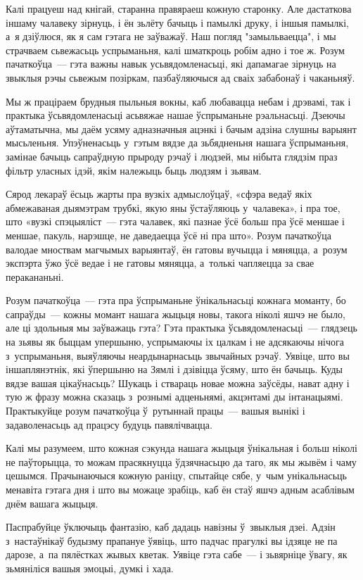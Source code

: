 Калі працуеш над кнігай, старанна правяраеш кожную старонку. Але дастаткова іншаму чалавеку зірнуць, і ён зьлёту бачыць і памылкі друку, і іншыя памылкі, а~я дзіўлюся, як я сам гэтага не заўважаў. Наш погляд "замыльваецца", і мы страчваем сьвежасьць успрыманьня, калі шматкроць робім адно і тое ж. Розум пачаткоўца~--- гэта важны навык усьвядомленасьці, які дапамагае зірнуць на звыклыя рэчы сьвежым позіркам, пазбаўляючыся ад сваіх забабонаў і чаканьняў.

Мы ж праціраем брудныя пыльныя вокны, каб любавацца небам і дрэвамі, так і практыка ўсьвядомленасьці асьвяжае нашае ўспрыманьне рэальнасьці. Дзеючы аўтаматычна, мы даём усяму адназначныя ацэнкі і бачым адзіна слушны варыянт мысьленьня. Упэўненасьць у~гэтым вядзе да зьбядненьня нашага ўспрыманьня, замінае бачыць сапраўдную прыроду рэчаў і людзей, мы нібыта глядзім праз фільтр уласных ідэй, якім належыць быць людзям і зьявам.

Сярод лекараў ёсьць жарты пра вузкіх адмыслоўцаў, «сфэра ведаў якіх абмежаваная дыямэтрам трубкі, якую яны ўстаўляюць у~чалавека», і пра тое, што «вузкі спэцыяліст~--- гэта чалавек, які пазнае ўсё больш пра ўсё меншае і меншае, пакуль, нарэшце, не даведаецца ўсё ні пра што». Розум пачаткоўца валодае мноствам магчымых варыянтаў, ён гатовы вучыцца і мяняцца, а~розум экспэрта ўжо ўсё ведае і не гатовы мяняцца, а~толькі чапляецца за свае перакананьні.

Розум пачаткоўца~--- гэта пра ўспрыманьне ўнікальнасьці кожнага моманту, бо сапраўды~--- кожны момант нашага жыцьця новы, такога ніколі яшчэ не было, але ці здольныя мы заўважаць гэта? Гэта практыка ўсьвядомленасьці~--- глядзець на зьявы як быццам упершыню, успрымаючы іх цалкам і не адсякаючы нічога з~успрыманьня, выяўляючы неардынарнасьць звычайных рэчаў. Уявіце, што вы іншаплянэтнік, які ўпершыню на Зямлі і дзівіцца ўсяму, што ён бачыць. Куды вядзе вашая цікаўнасьць? Шукаць і ствараць новае можна заўсёды, нават адну і тую ж фразу можна сказаць з~рознымі адценьнямі, акцэнтамі ды інтанацыямі. Практыкуйце розум пачаткоўца ў~рутыннай працы~--- вашыя вынікі і задаволенасьць ад працэсу будуць павялічвацца. 

Калі мы разумеем, што кожная сэкунда нашага жыцьця ўнікальная і больш ніколі не паўторыцца, то можам прасякнуцца ўдзячнасьцю да таго, як мы жывём і чаму цешымся. Прачынаючыся кожную раніцу, спытайце сябе, у~чым унікальнасьць менавіта гэтага дня і што вы можаце зрабіць, каб ён стаў яшчэ адным асаблівым днём вашага жыцьця.

Паспрабуйце ўключыць фантазію, каб дадаць навізны ў~звыклыя дзеі. Адзін з~настаўнікаў будызму прапануе ўявіць, што падчас прагулкі вы ідзяце не па дарозе, а~па пялёстках жывых кветак. Уявіце гэта сабе~--- і зьвярніце ўвагу, як зьмяніліся вашыя эмоцыі, думкі і хада.

